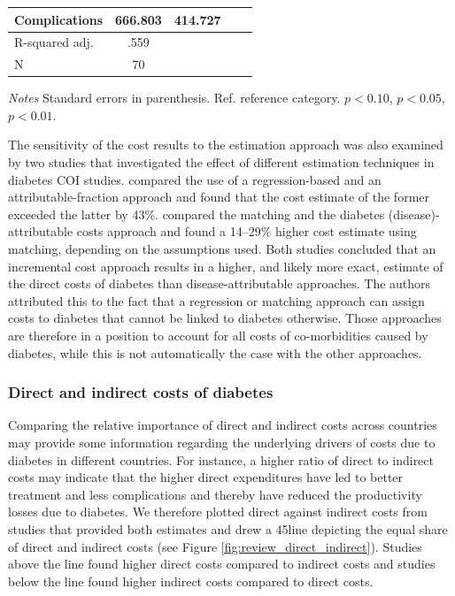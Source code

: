 \begin{table}[p]
\begin{center}
\begin{adjustbox}{max width=\linewidth}
\begin{threeparttable}
{\begin{tabular}{l*{2}{SS}}
                Complications & 666.803 & 414.727 \\
\midrule
                R-squared adj. & .559 &  \\
                N & 70 &  \\ 
 \bottomrule
\end{tabular}
\begin{tablenotes}
\item \footnotesize \textit{Notes} Standard errors in parenthesis. Ref. reference category.
\sym{*} \(p<0.10\), \sym{**} \(p<0.05\), \sym{***} \(p<0.01\).
\end{tablenotes}
}
\end{threeparttable}
\end{adjustbox}
\end{center}
\end{table}

The sensitivity of the cost results to the estimation approach was also examined by two studies that investigated the effect of different estimation techniques in diabetes \ac{COI} studies. \textcite{Honeycutt2009a} compared the use of a regression-based and an attributable-fraction approach and found that the cost estimate of the former exceeded the latter by 43\%. \textcite{Tunceli2010c} compared the matching and the diabetes (disease)-attributable costs approach and found a 14--29\% higher cost estimate using matching, depending on the assumptions used. Both studies concluded that an incremental cost approach results in a higher, and likely more exact, estimate of the direct costs of diabetes than disease-attributable approaches. The authors attributed this to the fact that a regression or matching approach can assign costs to diabetes that cannot be linked to diabetes otherwise. Those approaches are therefore in a position to account for all costs of co-morbidities caused by diabetes, while this is not automatically the case with the other approaches.

\subsubsection{Direct and indirect costs of diabetes}

Comparing the relative importance of direct and indirect costs across countries may provide some information regarding the underlying drivers of costs due to diabetes in different countries. For instance, a higher ratio of direct to indirect costs may indicate that the higher direct expenditures have led to better treatment and less complications and thereby have reduced the productivity losses due to diabetes. We therefore plotted direct against indirect costs from studies that provided both estimates and drew a 45\degree line depicting the equal share of direct and indirect costs (see Figure \ref{fig:review_direct_indirect}). Studies above the line found higher direct costs compared to indirect costs and studies below the line found higher indirect costs compared to direct costs.

